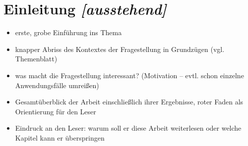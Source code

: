 \documentclass[../main/thesis.tex]{subfiles}
\begin{document}
\chapter{Einleitung \emph{[ausstehend]}}

\begin{itemize}
	\item erste, grobe Einführung ins Thema
	\item knapper Abriss des Kontextes der Fragestellung in Grundzügen (vgl. Themenblatt)
	\item was macht die Fragestellung interessant? (Motivation -- evtl. schon einzelne Anwendungsfälle umreißen)
	\item Gesamtüberblick der Arbeit einschließlich ihrer Ergebnisse, roter Faden als Orientierung für den Leser
	\item Eindruck an den Leser: warum soll er diese Arbeit weiterlesen oder welche Kapitel kann er überspringen
\end{itemize}




\end{document}
